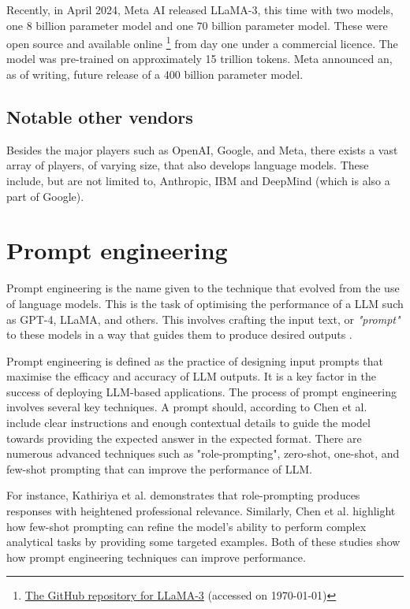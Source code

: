 Recently, in April 2024, Meta AI released LLaMA-3, this time with two models, one 8 billion parameter model and one 70 billion parameter model. These were open source and available online \footnote{\href{https://github.com/meta-llama/llama3}{The GitHub repository for LLaMA-3} (accessed on \today)} from day one under a commercial licence. The model was pre-trained on approximately 15 trillion tokens. Meta announced an, as of writing, future release of a 400 billion parameter model.


\subsection{Notable other vendors}


Besides the major players such as OpenAI, Google, and Meta, there exists a vast array of players, of varying size, that also develops language models. These include, but are not limited to, Anthropic, IBM and DeepMind (which is also a part of Google).


\section{Prompt engineering}
\label{sec:prompt_engineering}


Prompt engineering is the name given to the technique that evolved from the use of language models. This is the task of optimising the performance of a \gls{LLM} such as GPT-4, LLaMA, and others. This involves crafting the input text, or \textit{"prompt"} to these models in a way that guides them to produce desired outputs \cite{kathiriya_power_2023, chen_unleashing_2023}.


Prompt engineering is defined as the practice of designing input prompts that maximise the efficacy and accuracy of \gls{LLM} outputs. It is a key factor in the success of deploying \gls{LLM}-based applications. The process of prompt engineering involves several key techniques. A prompt should, according to Chen et al. include clear instructions and enough contextual details to guide the model towards providing the expected answer in the expected format. There are numerous advanced techniques such as "role-prompting", zero-shot, one-shot, and few-shot prompting that can improve the performance of \gls{LLM}.


For instance, Kathiriya et al. \cite{kathiriya_power_2023} demonstrates that role-prompting produces responses with heightened professional relevance. Similarly, Chen et al. highlight how few-shot prompting can refine the model's ability to perform complex analytical tasks by providing some targeted examples. Both of these studies show how prompt engineering techniques can improve performance.


